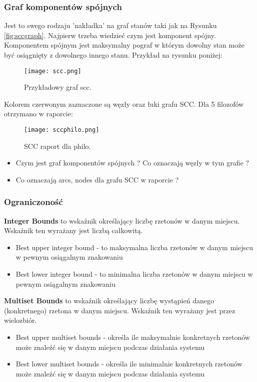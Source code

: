 \documentclass[a4paper,15pt]{article}
\begin{document}
\subsubsection{Graf komponentów spójnych}
Jest to swego rodzaju 'nakładka' na graf stanów taki jak na Rysunku \ref{fig:sccgraph}. Najpierw trzeba wiedzieć czym jest komponent spójny. \\
Komponentem spójnym jest maksymalny pograf w którym dowolny stan może być osiągnięty z dowolnego innego stanu. Przykład na rysunku poniżej: 
\begin{figure}[H]
\centerline{\texttt{[image: scc.png]}}
\caption{Przykładowy graf scc.}
\label{fig:scc}
\end{figure}
Kolorem czerwonym zaznaczone są węzły oraz łuki grafu SCC. Dla 5 filozofów otrzymano w raporcie:
\begin{figure}[H]
\centerline{\texttt{[image: sccphilo.png]}}
\caption{SCC raport dla philo.}
\label{fig:sccphilo}
\end{figure}

\begin{framed}
\begin{itemize}
\item Czym jest graf komponentów spójnych ? Co oznaczają węzły w tym grafie ?
\item Co oznaczają arcs, nodes dla grafu SCC w raporcie ?
\end{itemize}
\end{framed}


\subsubsection{Ograniczoność}
\textbf{Integer Bounds} to wskaźnik określający liczbę rzetonów w danym miejscu. Wskaźnik ten wyrażany jest liczbą całkowitą.
\begin{itemize}
\item Best upper integer bound - to maksymalna liczba rzetonów w danym miejscu w pewnym osiągalnym znakowaniu
\item Best lower integer bound - to minimalna liczba rzetonów w danym miejscu w pewnym osiągalnym znakowaniu
\end{itemize} 

\textbf{Multiset Bounds} to wskaźnik określający liczbę wystąpień danego (konkretnego) rzetona w danym miejscu. Wskaźnik ten wyrażany jest przez wielozbiór.
\begin{itemize}
\item Best upper multiset bounds - określa ile maksymalnie konkretnych rzetonów może znaleźć się w danym miejscu podczas działania systemu 
\item Best lower multiset bounds - określa ile minimalnie konkretnych rzetonów może znaleźć się w danym miejscu podczas działania systemu 
\end{itemize} 
\end{document}
